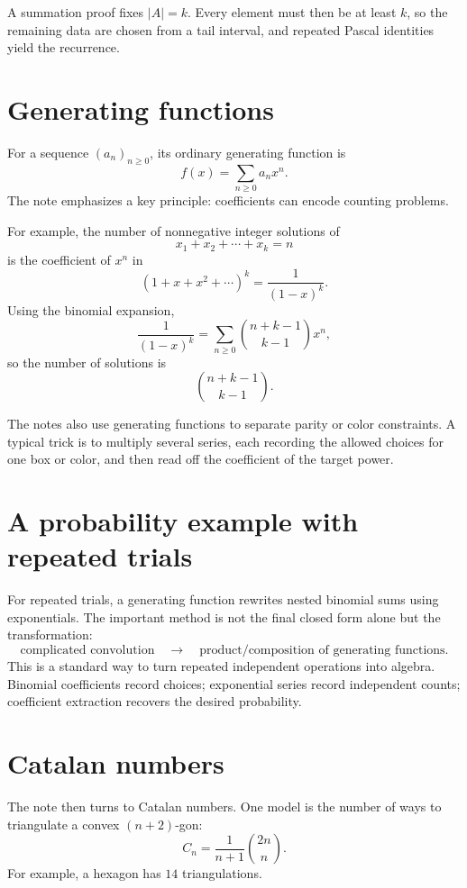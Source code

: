 A summation proof fixes $|A|=k$.  Every element must then be at least $k$, so the remaining data are chosen from a tail interval, and repeated Pascal identities yield the recurrence.

\section{Generating functions}

For a sequence $(a_n)_{n\ge0}$, its ordinary generating function is
\[
  f(x)=\sum_{n\ge0}a_nx^n.
\]
The note emphasizes a key principle: coefficients can encode counting problems.

For example, the number of nonnegative integer solutions of
\[
  x_1+x_2+\cdots+x_k=n
\]
is the coefficient of $x^n$ in
\[
  (1+x+x^2+\cdots)^k=\frac1{(1-x)^k}.
\]
Using the binomial expansion,
\[
  \frac1{(1-x)^k}=\sum_{n\ge0}\binom{n+k-1}{k-1}x^n,
\]
so the number of solutions is
\[
  \binom{n+k-1}{k-1}.
\]

The notes also use generating functions to separate parity or color constraints.  A typical trick is to multiply several series, each recording the allowed choices for one box or color, and then read off the coefficient of the target power.

\enlargethispage{4\baselineskip}
\section{A probability example with repeated trials}

For repeated trials, a generating function rewrites nested binomial sums using exponentials.  The important method is not the final closed form alone but the transformation:
\[
  \text{complicated convolution}
  \quad\longrightarrow\quad
  \text{product/composition of generating functions}.
\]
This is a standard way to turn repeated independent operations into algebra.  Binomial coefficients record choices; exponential series record independent counts; coefficient extraction recovers the desired probability.

\section{Catalan numbers}

The note then turns to Catalan numbers.  One model is the number of ways to triangulate a convex $(n+2)$-gon:
\[
  C_n=\frac1{n+1}\binom{2n}{n}.
\]
For example, a hexagon has $14$ triangulations.

